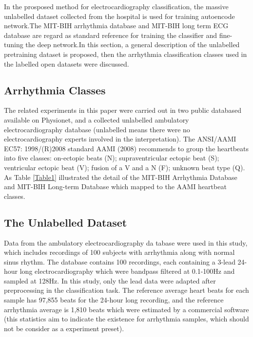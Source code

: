 \documentclass[journal]{IEEEtran}
\begin{document}
In the prosposed method for electrocardiography classification, the massive unlabelled dataset collected from the hospital is used for training autoencode network.The MIT-BIH arrhythmia database and MIT-BIH long term ECG database are regard as standard reference for training the classifier and fine-tuning the deep network.In this section, a general description of the unlabelled pretraining dataset is proposed, then the arrhythmia classification classes used in the labelled open datasets were discussed.
     

\subsection{Arrhythmia Classes}
The related experiments in this paper were carried out in two public databased available on Physionet, and a collected unlabelled ambulatory electrocardiography database (unlabelled means there were no electrocardiography experts involved in the interpretation). 
The ANSI/AAMI EC57: 1998/(R)2008 standard AAMI (2008) recommends to group the heartbeats into five classes: on-ectopic beats (N); supraventricular ectopic beat (S); ventricular ectopic beat (V); fusion of a V and a N (F); unknown beat type (Q).
As Table \ref{Table1} illustrated the detail of the MIT-BIH Arrhythmia Database and MIT-BIH Long-term Database which mapped to the AAMI heartbeat classes.

\subsection{The Unlabelled Dataset}
Data from the ambulatory electrocardiography da tabase were used in this study, which includes recordings of 100 subjects with arrhythmia along with normal sinus rhythm. The database contains 100 recordings, each containing a 3-lead 24-hour long electrocardiography which were bandpass filtered at 0.1-100Hz and sampled at 128Hz. In this study, only the lead \uppercase\expandafter{} data were adapted after preprocessing in the classification task. The reference average heart beats for each sample has 97,855 beats for the 24-hour long recording, and the reference arrhythmia average is 1,810 beats which were estimated by a commercial software (this statistics aim to indicate the existence for arrhythmia samples, which should not be consider as a experiment preset).
\end{document}
